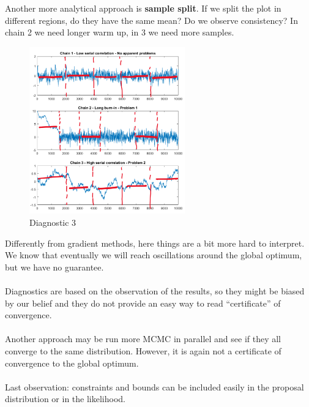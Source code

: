\noindent
Another more analytical approach is \textbf{sample split}. If we split
the plot in different regions, do they have the same mean? Do we observe
consistency? In chain 2 we need longer warm up, in 3 we need more
samples.

\begin{figure}
\centering
\includegraphics[width=0.6\textwidth]{diag_3.png}
\caption{Diagnostic 3}
\end{figure}
\noindent
Differently from gradient methods, here things are a bit more hard to
interpret. We know that eventually we will reach oscillations around the
global optimum, but we have no guarantee.
\\
\\
\noindent
Diagnostics are based on the observation of the results, so they might
be biased by our belief and they do not provide an easy way to read
``certificate'' of convergence.
\\
\\
\noindent
Another approach may be run more MCMC in parallel and see if they all
converge to the same distribution. However, it is again not a
certificate of convergence to the global optimum.
\\
\\
\noindent
Last observation: constraints and bounds can be included easily in the
proposal distribution or in the likelihood.


